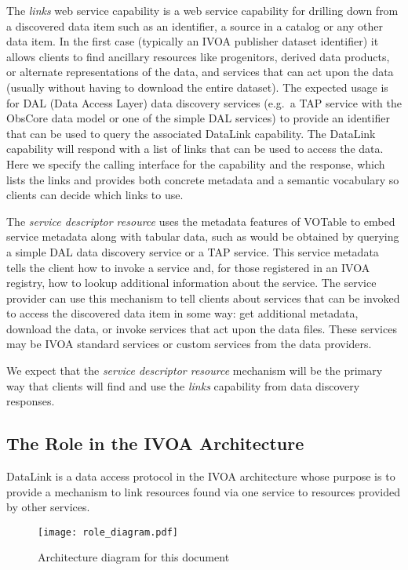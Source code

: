 \documentclass[11pt,a4paper]{ivoa}
\begin{document}
The {\em links\/} web service capability is a web service capability
for drilling
down from a discovered data item such as an identifier,
a source in a catalog or any other data item. In the first case
(typically an IVOA publisher dataset identifier) it allows
clients to find ancillary resources like progenitors, derived data
products, or alternate representations of the data, and
services that can act upon the data (usually without having to download
the entire dataset). The expected usage is for DAL (Data Access Layer)
data discovery services (e.g.\ a TAP service \citep{2010ivoa.spec.0327D}
with the ObsCore \citep{2017ivoa.spec.0509L} data
model or one of the simple DAL services) to provide an identifier that
can be used to query the associated DataLink capability. The DataLink
capability will respond with a list of links that can be used to access
the data. Here we specify the calling interface for the capability and
the response, which lists the links and provides both concrete metadata
and a semantic vocabulary so clients can decide which links to use.

The {\em service descriptor resource\/}
uses the metadata features of VOTable to
embed service metadata along with tabular data, such as would be obtained
by querying a simple DAL data discovery service or a TAP service. This
service metadata tells the client how to invoke a service and, for those
registered in an IVOA registry, how to lookup additional information
about the service. The service provider can use this mechanism to tell
clients about services that can be invoked to access the discovered
data item in some way: get additional metadata, download the data, or
invoke services that act upon the data files. These services may be
IVOA standard services or custom services from the data providers.

We expect that the {\em service descriptor resource\/}
mechanism will be the primary way that clients will find and
use the {\em links\/} capability from data discovery
responses.


\subsection{The Role in the IVOA Architecture}

DataLink is a data access protocol in the IVOA architecture whose purpose
is to provide a mechanism to link resources found via one service to
resources provided by other services.

\begin{figure}[ht]
\centering
\texttt{[image: role\_diagram.pdf]}
\caption{Architecture diagram for this document}
\label{fig:archdiag}
\end{figure}
\end{document}
